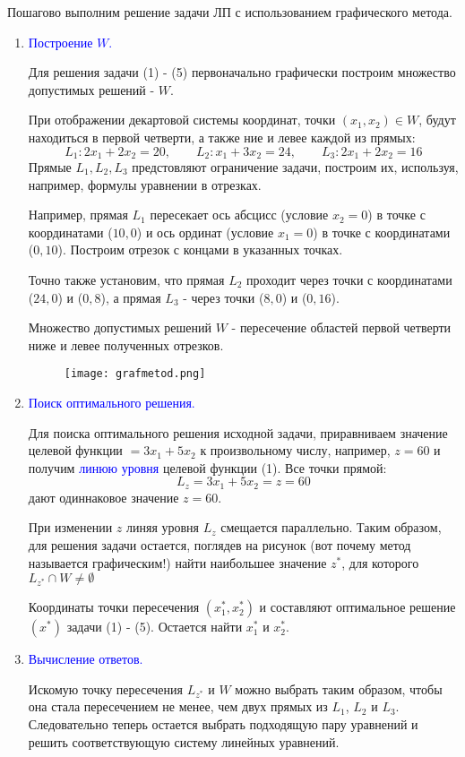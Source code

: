 \documentclass[14pt, letterpaper]{article}
\begin{document}
Пошагово выполним решение задачи ЛП с использованием графического метода.
\begin{enumerate}
    \item \textcolor{blue}{Построение $W$.}
    
    Для решения задачи (1) - (5) первоначально графически построим множество допустимых решений - $W$.
    
При отображении декартовой системы координат, точки $(x_{1}, x_{2}) \in W$, будут находиться в первой четверти, а также ние и левее каждой из прямых:
$$L_{1}: 2x_{1} + 2x_{2} = 20,\qquad  L_{2}: x_{1} + 3x_{2} = 24,\qquad  L_{3}: 2x_{1} + 2x_{2} = 16$$
Прямые $L_{1}, L_{2}, L_{3}$ предстовляют ограничение задачи, построим их, используя, например, формулы уравнении в отрезках.


    Например, прямая $L_{1}$ пересекает ось абсцисс (условие $x_{2} = 0$) в точке с координатами ($10, 0$) и ось ординат (условие $x_{1} = 0$) в точке с координатами ($0, 10$). Построим отрезок с концами в указанных точках. 

    Точно также установим, что прямая $L_{2}$ проходит через точки с координатами ($24, 0$) и ($0, 8$), а прямая $L_{3}$ - через точки ($8, 0$) и ($0, 16$).

    Множество допустимых решений $W$ - пересечение областей первой четверти ниже и левее полученных отрезков.
    \begin{figure}[h]
    \centering       
    \texttt{[image: grafmetod.png]}        
    \end{figure}
        
    \item \textcolor{blue}{Поиск оптимального решения.}
    
    Для поиска оптимального решения исходной задачи, приравниваем значение целевой функции $= 3x_{1} + 5x_{2}$ к произвольному числу, например, $z = 60$ и получим \textcolor{blue}{линюю уровня} целевой функции (1). Все точки прямой: 
    $$L_{z} = 3x_{1} + 5x_{2} = z = 60 $$
    дают одиннаковое значение $z = 60$.

    При изменении $z$ линяя уровня $L_{z}$ смещается параллельно.
    Таким образом, для решения задачи остается, поглядев на рисунок (вот почему метод называется графическим!) найти наибольшее значение $z^{*}$, для которого $L_{z^{*}} \cap W \neq \emptyset$

    Координаты точки пересечения $(x_{1}^{*}, x_{2}^{*})$ и составляют оптимальное решение $(x^{*})$ задачи (1) - (5). Остается найти $x_{1}^{*}$ и $x_{2}^{*}$.
    
    \item \textcolor{blue}{Вычисление ответов.}

    Искомую точку пересечения $L_{z^{*}}$ и $W$ можно выбрать таким образом, чтобы она стала пересечением не менее, чем двух прямых из $L_{1}$, $L_{2}$ и $L_{3}$. Следовательно теперь остается выбрать подходящую пару уравнений и решить соответствующую систему линейных уравнений.
\end{enumerate}
\end{document}
